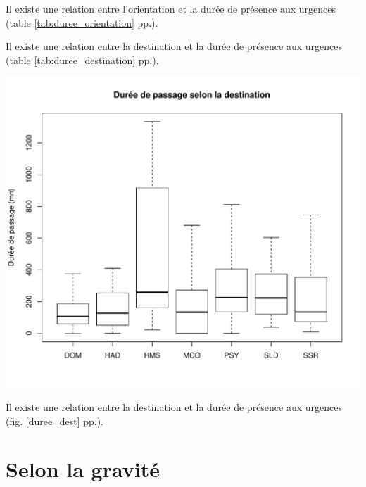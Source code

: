 \documentclass[12pt,english,french,twoside]{book}\usepackage[]{graphicx}\usepackage[]{color}
\makeatletter
\def\maxwidth{ %
  \ifdim\Gin@nat@width>\linewidth
    \linewidth
  \else
    \Gin@nat@width
  \fi
}
\newenvironment{knitrout}{}{} %
\makeatother
\begin{document}
Il existe une relation entre l'orientation et la durée de présence aux urgences (table \ref{tab:duree_orientation} pp.\pageref{tab:duree_orientation}).

Il existe une relation entre la destination et la durée de présence aux urgences (table \ref{tab:duree_destination} pp.\pageref{tab:duree_destination}).

\begin{center}
\begin{knitrout}
\color{fgcolor}
\includegraphics[width=\maxwidth]{figure/bp_duree_dest} 

\end{knitrout}

 \label{duree_dest}
\end{center}
Il existe une relation entre la destination et la durée de présence aux urgences (fig. \ref{duree_dest} pp.\pageref{duree_dest}).


\section{Selon la gravité}
\end{document}
